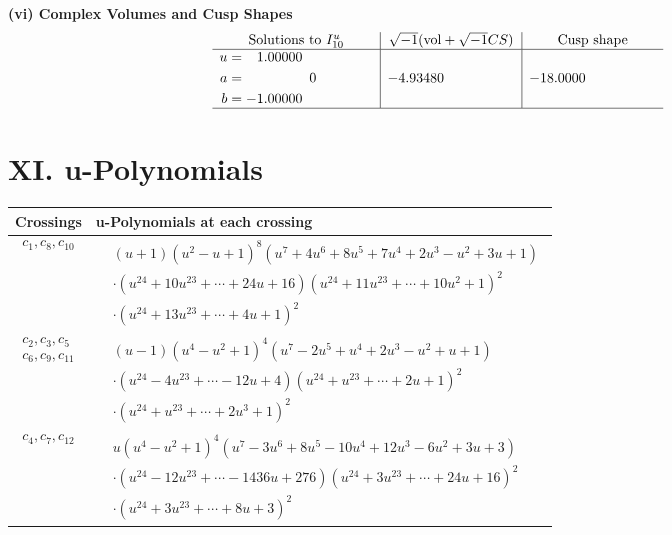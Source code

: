 \documentclass[1p]{elsarticle_modified}
\theoremstyle{definition}
\newcommand{\I}{\sqrt{-1}}
\begin{document}
\newpage\flushleft \textbf{(vi) Complex Volumes and Cusp Shapes}
$$\begin{array}{c|c|c}  
\text{Solutions to }I^u_{10}& \I (\text{vol} + \sqrt{-1}CS) & \text{Cusp shape}\\
 \hline 
\begin{aligned}
u &= \phantom{-}1.00000\phantom{ +0.000000I} \\
a &= \phantom{-0.000000 } 0 \\
b &= -1.00000\phantom{ +0.000000I}\end{aligned}
 & -4.93480\phantom{ +0.000000I} & -18.0000\phantom{ +0.000000I}\\
 \hline 
 \end{array}$$\newpage
\newpage\renewcommand{\arraystretch}{1}
\centering \section*{ XI. u-Polynomials}
\begin{tabular}{m{50pt}|m{274pt}}
Crossings & \hspace{64pt}u-Polynomials at each crossing \\
\hline $$\begin{aligned}c_{1},c_{8},c_{10}\end{aligned}$$&$\begin{aligned}
&(u+1)(u^2- u+1)^8(u^7+4 u^6+8 u^5+7 u^4+2 u^3- u^2+3 u+1)\\
&\cdot(u^{24}+10 u^{23}+\cdots+24 u+16)(u^{24}+11 u^{23}+\cdots+10 u^2+1)^{2}\\
&\cdot(u^{24}+13 u^{23}+\cdots+4 u+1)^{2}
\end{aligned}$\\
\hline $$\begin{aligned}c_{2},c_{3},c_{5}\\c_{6},c_{9},c_{11}\end{aligned}$$&$\begin{aligned}
&(u-1)(u^4- u^2+1)^4(u^7-2 u^5+u^4+2 u^3- u^2+u+1)\\
&\cdot(u^{24}-4 u^{23}+\cdots-12 u+4)(u^{24}+u^{23}+\cdots+2 u+1)^{2}\\
&\cdot(u^{24}+u^{23}+\cdots+2 u^3+1)^{2}
\end{aligned}$\\
\hline $$\begin{aligned}c_{4},c_{7},c_{12}\end{aligned}$$&$\begin{aligned}
&u(u^4- u^2+1)^4(u^7-3 u^6+8 u^5-10 u^4+12 u^3-6 u^2+3 u+3)\\
&\cdot(u^{24}-12 u^{23}+\cdots-1436 u+276)(u^{24}+3 u^{23}+\cdots+24 u+16)^{2}\\
&\cdot(u^{24}+3 u^{23}+\cdots+8 u+3)^{2}
\end{aligned}$\\
\hline
\end{tabular}\newpage\renewcommand{\arraystretch}{1}
\end{document}
